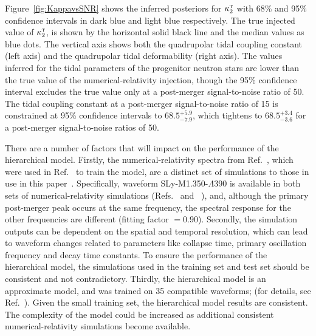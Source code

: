 \documentclass[../Thesis.tex]{subfiles}
\begin{document}
   Figure~\ref{fig:KappavsSNR} shows the inferred posteriors for $\kappa_2^\textsc{t}$ with 68\% and 95\% confidence intervals in dark blue and light blue respectively. 
    The true injected value of $\kappa_2^\textsc{t}$, is shown by the horizontal solid black line and the median values as blue dots. 
    The  vertical axis shows both the quadrupolar tidal coupling constant (left axis) and the quadrupolar tidal deformability (right axis). 
    The values inferred for the tidal parameters of the progenitor neutron stars are lower than the true value of the numerical-relativity injection, though the 95\% confidence interval excludes the true value only at a post-merger signal-to-noise ratio of 50.  
    The tidal coupling constant at a post-merger signal-to-noise ratio of 15 is  constrained at 95\% confidence intervals  to $68.5^{+5.9}_{-7.9}$, which tightens  to $68.5^{+3.4}_{-3.6}$ for  a post-merger signal-to-noise ratios of 50. \par
     There are a number of factors that will impact on the performance of the hierarchical model.
     Firstly, the numerical-relativity spectra from Ref.~\cite{Rezzolla2016}, which were used in Ref.~\cite{Easter2019} to train the model, are a distinct set of simulations to those in use in this paper~\cite{Dietrich2018}.
     Specifically, waveform SLy-M1.350-$\Lambda$390 is available in both sets of numerical-relativity simulations (Refs.~\cite{Dietrich2018} and ~\cite{Rezzolla2016}), and, although the primary post-merger peak occurs at the same frequency, the spectral response for the other frequencies are different (fitting factor $= 0.90$).
     Secondly, the simulation outputs can be dependent on the spatial and temporal resolution, which can lead to waveform changes related to parameters like collapse time, primary oscillation frequency and decay time constants. 
     To ensure the performance of the hierarchical model, the simulations used in the training set and test set should be consistent and not contradictory.
     Thirdly, the hierarchical model is an approximate model, and was  trained on 35 compatible waveforms; (for details, see Ref.~\cite{Easter2019}).
     Given the small training set, the hierarchical model results are consistent. 
     The complexity of the model could be increased as additional consistent numerical-relativity simulations become available. \par
\end{document}
